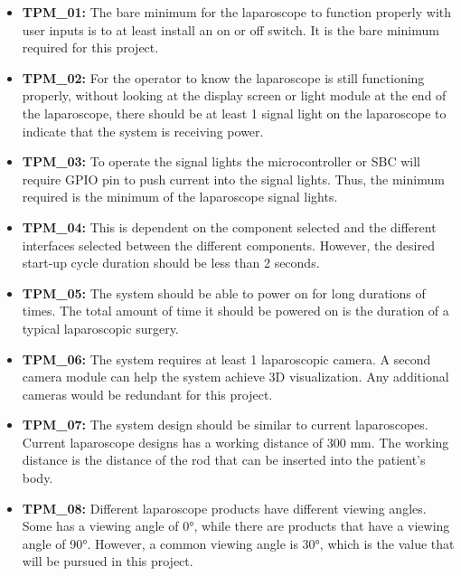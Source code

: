 \begin{itemize}
     

    \item\textbf{TPM\_01:} The bare minimum for the laparoscope to function properly with user inputs is to at least install an on or off switch. It is the bare minimum required for this project.

    \item\textbf{TPM\_02:} For the operator to know the laparoscope is still functioning properly, without looking at the display screen or light module at the end of the laparoscope, there should be at least 1 signal light on the laparoscope to indicate that the system is receiving power.

    \item\textbf{TPM\_03:} To operate the signal lights the microcontroller or SBC will require GPIO pin to push current into the signal lights. Thus, the minimum required is the minimum of the laparoscope signal lights.

    \item\textbf{TPM\_04:} This is dependent on the component selected and the different interfaces selected between the different components. However, the desired start-up cycle duration should be less than 2 seconds.

    \item\textbf{TPM\_05:} The system should be able to power on for long durations of times. The total amount of time it should be powered on is the duration of a typical laparoscopic surgery. 

    \item\textbf{TPM\_06:} The system requires at least 1 laparoscopic camera. A second camera module can help the system achieve 3D visualization. Any additional cameras would be redundant for this project.

    \item\textbf{TPM\_07:} The system design should be similar to current laparoscopes. Current laparoscope designs has a working distance of 300 mm. The working distance is the distance of the rod that can be inserted into the patient's body.

    \item\textbf{TPM\_08:} Different laparoscope products have different viewing angles. Some has a viewing angle of 0°, while there are products that have a viewing angle of 90°. However, a common viewing angle is 30°, which is the value that will be pursued in this project.


\end{itemize}
